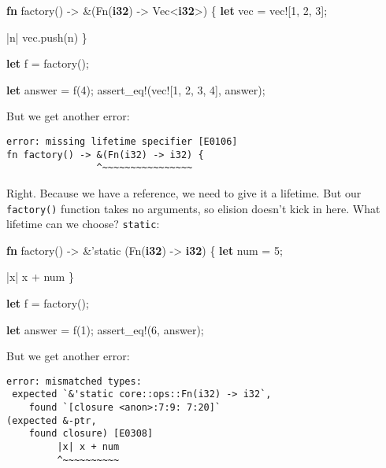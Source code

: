 \documentclass[a4paper,]{book}
\newenvironment{Shaded}{\begin{snugshade}}{\end{snugshade}}
\newcommand{\KeywordTok}[1]{\textcolor[rgb]{0.13,0.29,0.53}{\textbf{{#1}}}}
\newcommand{\DecValTok}[1]{\textcolor[rgb]{0.00,0.00,0.81}{{#1}}}
\newcommand{\OtherTok}[1]{\textcolor[rgb]{0.56,0.35,0.01}{{#1}}}
\newcommand{\NormalTok}[1]{{#1}}
\begin{document}
\begin{Shaded}
\begin{Highlighting}[]
\KeywordTok{fn} \NormalTok{factory() -> &(Fn(}\KeywordTok{i32}\NormalTok{) -> Vec<}\KeywordTok{i32}\NormalTok{>) \{}
    \KeywordTok{let} \NormalTok{vec = }\OtherTok{vec!}\NormalTok{[}\DecValTok{1}\NormalTok{, }\DecValTok{2}\NormalTok{, }\DecValTok{3}\NormalTok{];}

    \NormalTok{|n| vec.push(n)}
\NormalTok{\}}

\KeywordTok{let} \NormalTok{f = factory();}

\KeywordTok{let} \NormalTok{answer = f(}\DecValTok{4}\NormalTok{);}
\OtherTok{assert_eq!}\NormalTok{(}\OtherTok{vec!}\NormalTok{[}\DecValTok{1}\NormalTok{, }\DecValTok{2}\NormalTok{, }\DecValTok{3}\NormalTok{, }\DecValTok{4}\NormalTok{], answer);}
\end{Highlighting}
\end{Shaded}

But we get another error:

\begin{verbatim}
error: missing lifetime specifier [E0106]
fn factory() -> &(Fn(i32) -> i32) {
                ^~~~~~~~~~~~~~~~~
\end{verbatim}

Right. Because we have a reference, we need to give it a lifetime. But
our \texttt{factory()} function takes no arguments, so elision doesn't
kick in here. What lifetime can we choose?
\texttt{\textquotesingle{}static}:

\begin{Shaded}
\begin{Highlighting}[]
\KeywordTok{fn} \NormalTok{factory() -> &}\OtherTok{'static} \NormalTok{(Fn(}\KeywordTok{i32}\NormalTok{) -> }\KeywordTok{i32}\NormalTok{) \{}
    \KeywordTok{let} \NormalTok{num = }\DecValTok{5}\NormalTok{;}

    \NormalTok{|x| x + num}
\NormalTok{\}}

\KeywordTok{let} \NormalTok{f = factory();}

\KeywordTok{let} \NormalTok{answer = f(}\DecValTok{1}\NormalTok{);}
\OtherTok{assert_eq!}\NormalTok{(}\DecValTok{6}\NormalTok{, answer);}
\end{Highlighting}
\end{Shaded}

But we get another error:

\begin{verbatim}
error: mismatched types:
 expected `&'static core::ops::Fn(i32) -> i32`,
    found `[closure <anon>:7:9: 7:20]`
(expected &-ptr,
    found closure) [E0308]
         |x| x + num
         ^~~~~~~~~~~
\end{verbatim}
\end{document}
